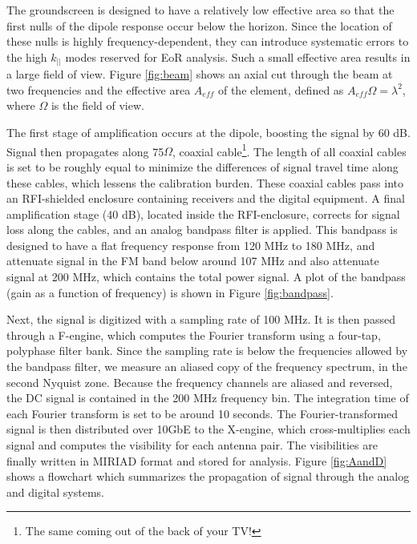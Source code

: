 The groundscreen is designed to have a relatively low effective area so that the first nulls of the
dipole response occur below the horizon. Since the location of these nulls is highly
frequency-dependent, they can introduce systematic errors to the high $k_{||}$ modes reserved for
EoR analysis. Such a small effective area results in a large field of view. Figure \ref{fig:beam} shows an axial cut through
the beam at two frequencies and the effective area $A_{eff}$ of the element, defined as
$A_{eff}\Omega = \lambda^2$, where $\Omega$
is the field of view.

The first stage of amplification occurs at the dipole, boosting the signal by 60 dB. Signal then
propagates along 75$\Omega$, coaxial cable\footnote{The same coming out of the back of your TV!}. The
length of all coaxial cables is set to be roughly equal to minimize the differences of signal travel
time along these cables, which lessens the calibration burden. These coaxial cables pass into
an RFI-shielded enclosure containing receivers and the digital equipment. A final amplification
stage (40 dB), located inside the RFI-enclosure, corrects for signal loss along the cables, and an analog bandpass filter is applied.
This bandpass is designed to have a flat frequency response from 120 MHz to 180 MHz, and attenuate
signal in the FM band below around 107 MHz and also attenuate signal at 200 MHz, which contains the total
power signal. A plot of the bandpass (gain as a function of frequency) is shown in Figure
\ref{fig:bandpass}.

Next, the signal is digitized with a sampling rate of 100 MHz. It is then passed through a F-engine,
which computes the Fourier transform using a four-tap, polyphase filter bank. Since the sampling
rate is below the frequencies allowed by the bandpass filter, we measure an aliased copy of the
frequency spectrum, in the second Nyquist zone. Because the frequency channels are aliased and
reversed, the DC signal is contained in the 200 MHz frequency bin.
The integration time of each Fourier transform is set to be around 10 seconds. The Fourier-transformed 
signal is then distributed over 10GbE to the X-engine, which cross-multiplies each signal and computes 
the visibility for each antenna pair. The visibilities are finally written in MIRIAD format
\cite{MIRIAD} and stored for analysis. Figure \ref{fig:AandD} shows a flowchart which summarizes 
the propagation of signal through the analog and digital systems.

